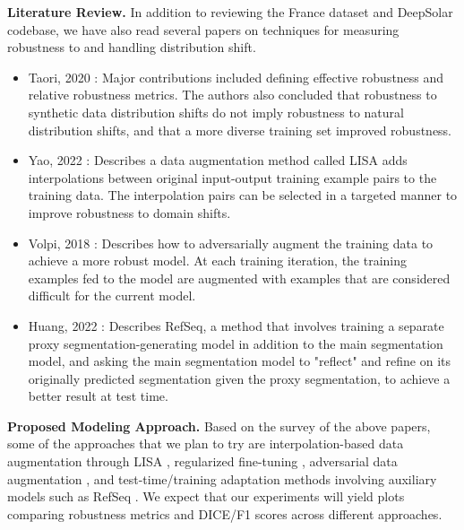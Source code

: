 \documentclass{article}
\begin{document}
\textbf{Literature Review.}
In addition to reviewing the France dataset and DeepSolar codebase, we have also read several papers on techniques for measuring robustness to and handling distribution shift.

\begin{itemize}
    \item Taori, 2020 \cite{Taori2020}: Major contributions included defining effective robustness and relative robustness metrics. The authors also concluded that robustness to synthetic data distribution shifts do not imply robustness to natural distribution shifts, and that a more diverse training set improved robustness.
    \item Yao, 2022 \cite{yao2022improving}: Describes a data augmentation method called LISA adds interpolations between original input-output training example pairs to the training data. The interpolation pairs can be selected in a targeted manner to improve robustness to domain shifts.
    \item Volpi, 2018 \cite{volpi2018generalizing}: Describes how to adversarially augment the training data to achieve a more robust model. At each training iteration, the training examples fed to the model are augmented with examples that are considered difficult for the current model.
    \item Huang, 2022 \cite{huang2022online}: Describes RefSeq, a method that involves training a separate proxy segmentation-generating model in addition to the main segmentation model, and asking the main segmentation model to "reflect" and refine on its originally predicted segmentation given the proxy segmentation, to achieve a better result at test time. 
\end{itemize}

\textbf{Proposed Modeling Approach.} 
Based on the survey of the above papers, some of the approaches that we plan to try are interpolation-based data augmentation through LISA \cite{yao2022improving}, regularized fine-tuning \cite{li2021}, adversarial data augmentation \cite{volpi2018generalizing}, and test-time/training adaptation methods involving auxiliary models such as RefSeq \cite{huang2022online}. We expect that our experiments will yield plots comparing robustness metrics and DICE/F1 scores across different approaches.



\end{document}
